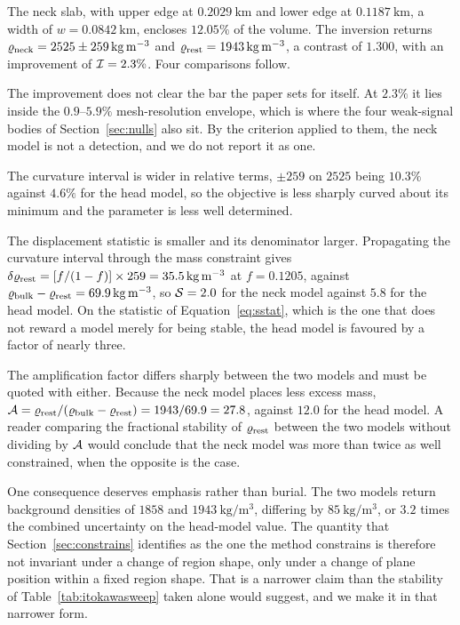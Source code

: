 The neck slab, with upper edge at $\SI{0.2029}{\kilo\metre}$ and lower
edge at $\SI{0.1187}{\kilo\metre}$, a width of
$w = \SI{0.0842}{\kilo\metre}$, encloses $12.05\%$ of the volume.
The inversion returns
$\varrho_{\mathrm{neck}} = 2525 \pm \SI{259}{\kilo\gram\per\cubic\metre}$ and
$\varrho_{\mathrm{rest}} = \SI{1943}{\kilo\gram\per\cubic\metre}$, a contrast of
$1.300$, with an improvement of $\mathcal{I} = 2.3\%$. Four comparisons
follow.

The improvement does not clear the bar the paper sets for itself. At
$2.3\%$ it lies inside the $0.9$--$5.9\%$ mesh-resolution envelope, which
is where the four weak-signal bodies of Section~\ref{sec:nulls} also sit.
By the criterion applied to them, the neck model is not a detection, and
we do not report it as one.

The curvature interval is wider in relative terms, $\pm259$ on $2525$
being $10.3\%$ against $4.6\%$ for the head model, so the objective is
less sharply curved about its minimum and the parameter is less well
determined.

The displacement statistic is smaller and its denominator larger.
Propagating the curvature interval through the mass constraint gives
$\delta\varrho_{\mathrm{rest}} = [f/(1-f)]\times 259 =
\SI{35.5}{\kilo\gram\per\cubic\metre}$ at $f = 0.1205$, against
$\varrho_{\mathrm{bulk}} - \varrho_{\mathrm{rest}} = \SI{69.9}{\kilo\gram\per\cubic\metre}$, so
$\mathcal{S} = 2.0$ for the neck model against $5.8$ for the head model. On
the statistic of Equation~\eqref{eq:sstat}, which is the one that does
not reward a model merely for being stable, the head model is favoured by
a factor of nearly three.

The amplification factor differs sharply between the two models and must
be quoted with either. Because the neck model places less excess mass,
$\mathcal{A} = \varrho_{\mathrm{rest}}/(\varrho_{\mathrm{bulk}}-\varrho_{\mathrm{rest}}) = 1943/69.9 = 27.8$, against
$12.0$ for the head model. A reader comparing the fractional stability of
$\varrho_{\mathrm{rest}}$ between the two models without dividing by $\mathcal{A}$ would
conclude that the neck model was more than twice as well constrained,
when the opposite is the case.

One consequence deserves emphasis rather than burial. The two models
return background densities of $1858$ and
$\SI{1943}{\kilo\gram\per\cubic\metre}$, differing by
$\SI{85}{\kilo\gram\per\cubic\metre}$, or $3.2$ times the combined
uncertainty on the head-model value. The quantity that
Section~\ref{sec:constrains} identifies as the one the method constrains
is therefore not invariant under a change of region shape, only under a
change of plane position within a fixed region shape. That is a narrower
claim than the stability of Table~\ref{tab:itokawasweep} taken alone
would suggest, and we make it in that narrower form.

